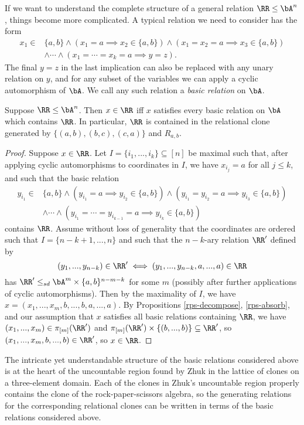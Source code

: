 If we want to understand the complete structure of a general relation $\RR \le \bA^n$, things become more complicated. A typical relation we need to consider has the form
\begin{align*}
x_1 \in &\{a,b\} \wedge (x_1 = a \implies x_2 \in \{a,b\}) \wedge (x_1 = x_2 = a \implies x_3 \in \{a,b\})\\
&\wedge \cdots \wedge (x_1 = \cdots = x_k = a \implies y=z).
\end{align*}
The final $y=z$ in the last implication can also be replaced with any unary relation on $y$, and for any subset of the variables we can apply a cyclic automorphism of $\bA$. We call any such relation a \emph{basic relation} on $\bA$.

\begin{thm} Suppose $\RR \le \bA^n$. Then $x \in \RR$ iff $x$ satisfies every basic relation on $\bA$ which contains $\RR$. In particular, $\RR$ is contained in the relational clone generated by $\{(a,b), (b,c), (c,a)\}$ and $R_{a,b}$.
\end{thm}
\begin{proof} Suppose $x \in \RR$. Let $I = \{i_1, ..., i_k\} \subseteq [n]$ be maximal such that, after applying cyclic automorphisms to coordinates in $I$, we have $x_{i_j} = a$ for all $j \le k$, and such that the basic relation
\begin{align*}
y_{i_1} \in &\{a,b\} \wedge (y_{i_1} = a \implies y_{i_2} \in \{a,b\}) \wedge (y_{i_1} = y_{i_2} = a \implies y_{i_3} \in \{a,b\})\\
&\wedge \cdots \wedge (y_{i_1} = \cdots = y_{i_{k-1}} = a \implies y_{i_k} \in \{a,b\})
\end{align*}
contains $\RR$. Assume without loss of generality that the coordinates are ordered such that $I = \{n-k+1, ..., n\}$ and such that the $n-k$-ary relation $\RR'$ defined by
\[
(y_1, ..., y_{n-k}) \in \RR' \iff (y_1, ..., y_{n-k}, a, ..., a) \in \RR
\]
has $\RR' \le_{sd} \bA^m\times \{a,b\}^{n-m-k}$ for some $m$ (possibly after further applications of cyclic automorphisms). Then by the maximality of $I$, we have $x = (x_1, ..., x_m, b, ..., b, a, ..., a)$. By Propositions \ref{rps-decompose}, \ref{rps-absorb}, and our assumption that $x$ satisfies all basic relations containing $\RR$, we have $(x_1, ..., x_m) \in \pi_{[m]}(\RR')$ and $\pi_{[m]}(\RR')\times \{(b,...,b)\} \subseteq \RR'$, so $(x_1, ..., x_m, b, ..., b) \in \RR'$, so $x \in \RR$.
\end{proof}

\begin{rem} The intricate yet understandable structure of the basic relations considered above is at the heart of the uncountable region found by Zhuk \cite{zhuk-selfdual} in the lattice of clones on a three-element domain. Each of the clones in Zhuk's uncountable region properly contains the clone of the rock-paper-scissors algebra, so the generating relations for the corresponding relational clones can be written in terms of the basic relations considered above.
\end{rem}

